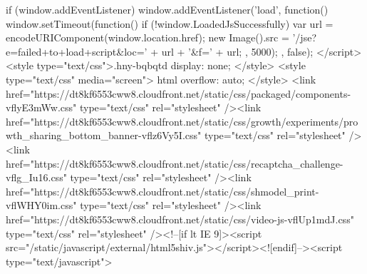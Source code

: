 {    if (window.addEventListener) {
        window.addEventListener('load', function() {
            window.setTimeout(function() {
                if (!window.LoadedJsSuccessfully) {
                    var url = encodeURIComponent(window.location.href);
                    new Image().src = '/jse?e=failed+to+load+script&loc=' + url + '&f=' + url;
                }
            }, 5000);
        }, false);
    }
</script><style type="text/css">.hny-bqbqtd { display: none; }</style> 
            <style type="text/css" media="screen">
                html {
                  overflow: auto;
                }
            </style>
        <link href="https://dt8kf6553cww8.cloudfront.net/static/css/packaged/components-vflyE3mWw.css" type="text/css" rel="stylesheet" /><link href="https://dt8kf6553cww8.cloudfront.net/static/css/growth/experiments/prowth_sharing_bottom_banner-vflz6Vy5I.css" type="text/css" rel="stylesheet" /><link href="https://dt8kf6553cww8.cloudfront.net/static/css/recaptcha_challenge-vflg_Iu16.css" type="text/css" rel="stylesheet" /><link href="https://dt8kf6553cww8.cloudfront.net/static/css/shmodel_print-vflWHY0im.css" type="text/css" rel="stylesheet" /><link href="https://dt8kf6553cww8.cloudfront.net/static/css/video-js-vflUp1mdJ.css" type="text/css" rel="stylesheet" /><!--[if lt IE 9]><script src="/static/javascript/external/html5shiv.js"></script><![endif]--><script type="text/javascript">
}
